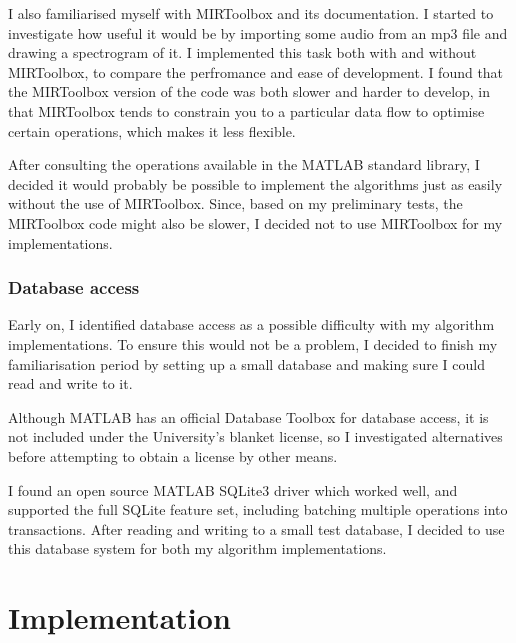 \documentclass[12pt,a4paper,twoside,openright]{report}
\begin{document}
I also familiarised myself with MIRToolbox and its documentation. I started to investigate how useful it would be by importing some audio from an mp3 file and drawing a spectrogram of it. I implemented this task both with and without MIRToolbox, to compare the perfromance and ease of development. I found that the MIRToolbox version of the code was both slower and harder to develop, in that MIRToolbox tends to constrain you to a particular data flow to optimise certain operations, which makes it less flexible.

After consulting the operations available in the MATLAB standard library, I decided it would probably be possible to implement the algorithms just as easily without the use of MIRToolbox. Since, based on my preliminary tests, the MIRToolbox code might also be slower, I decided not to use MIRToolbox for my implementations.

\subsection{Database access}

Early on, I identified database access as a possible difficulty with my algorithm implementations. To ensure this would not be a problem, I decided to finish my familiarisation period by setting up a small database and making sure I could read and write to it.

Although MATLAB has an official Database Toolbox for database access, it is not included under the University's blanket license, so I investigated alternatives before attempting to obtain a license by other means.

I found an open source MATLAB SQLite3 driver \cite{Yamaguchi14} which worked well, and supported the full SQLite feature set, including batching multiple operations into transactions. After reading and writing to a small test database, I decided to use this database system for both my algorithm implementations.





\chapter{Implementation}
\end{document}
